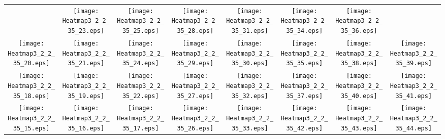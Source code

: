 \documentclass{standalone}
\begin{document}
\renewcommand{\arraystretch}{0}
\setlength{\tabcolsep}{0pt}
\begin{tabular}{ *8{c} }
 & \texttt{[image: Heatmap3\_2\_2\_35\_23.eps]} & \texttt{[image: Heatmap3\_2\_2\_35\_25.eps]} & \texttt{[image: Heatmap3\_2\_2\_35\_28.eps]} & \texttt{[image: Heatmap3\_2\_2\_35\_31.eps]} & \texttt{[image: Heatmap3\_2\_2\_35\_34.eps]} & \texttt{[image: Heatmap3\_2\_2\_35\_36.eps]} &  \\
\texttt{[image: Heatmap3\_2\_2\_35\_20.eps]} & \texttt{[image: Heatmap3\_2\_2\_35\_21.eps]} & \texttt{[image: Heatmap3\_2\_2\_35\_24.eps]} & \texttt{[image: Heatmap3\_2\_2\_35\_29.eps]} & \texttt{[image: Heatmap3\_2\_2\_35\_30.eps]} & \texttt{[image: Heatmap3\_2\_2\_35\_35.eps]} & \texttt{[image: Heatmap3\_2\_2\_35\_38.eps]} & \texttt{[image: Heatmap3\_2\_2\_35\_39.eps]} \\
\texttt{[image: Heatmap3\_2\_2\_35\_18.eps]} & \texttt{[image: Heatmap3\_2\_2\_35\_19.eps]} & \texttt{[image: Heatmap3\_2\_2\_35\_22.eps]} & \texttt{[image: Heatmap3\_2\_2\_35\_27.eps]} & \texttt{[image: Heatmap3\_2\_2\_35\_32.eps]} & \texttt{[image: Heatmap3\_2\_2\_35\_37.eps]} & \texttt{[image: Heatmap3\_2\_2\_35\_40.eps]} & \texttt{[image: Heatmap3\_2\_2\_35\_41.eps]} \\
\texttt{[image: Heatmap3\_2\_2\_35\_15.eps]} & \texttt{[image: Heatmap3\_2\_2\_35\_16.eps]} & \texttt{[image: Heatmap3\_2\_2\_35\_17.eps]} & \texttt{[image: Heatmap3\_2\_2\_35\_26.eps]} & \texttt{[image: Heatmap3\_2\_2\_35\_33.eps]} & \texttt{[image: Heatmap3\_2\_2\_35\_42.eps]} & \texttt{[image: Heatmap3\_2\_2\_35\_43.eps]} & \texttt{[image: Heatmap3\_2\_2\_35\_44.eps]} \\

\end{tabular}
\end{document}
